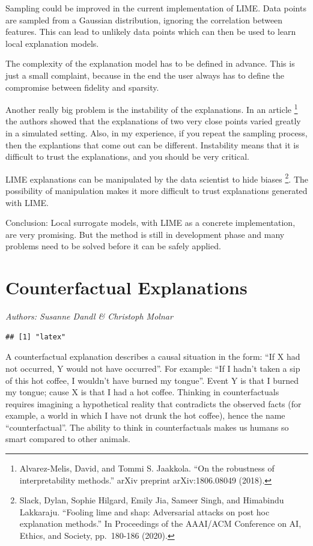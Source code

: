 \documentclass[
  11pt,
]{scrbook}
\begin{document}
Sampling could be improved in the current implementation of LIME.
Data points are sampled from a Gaussian distribution, ignoring the correlation between features.
This can lead to unlikely data points which can then be used to learn local explanation models.

The complexity of the explanation model has to be defined in advance.
This is just a small complaint, because in the end the user always has to define the compromise between fidelity and sparsity.

Another really big problem is the instability of the explanations.
In an article \footnote{Alvarez-Melis, David, and Tommi S. Jaakkola. ``On the robustness of interpretability methods.'' arXiv preprint arXiv:1806.08049 (2018).} the authors showed that the explanations of two very close points varied greatly in a simulated setting.
Also, in my experience, if you repeat the sampling process, then the explantions that come out can be different.
Instability means that it is difficult to trust the explanations, and you should be very critical.

LIME explanations can be manipulated by the data scientist to hide biases \footnote{Slack, Dylan, Sophie Hilgard, Emily Jia, Sameer Singh, and Himabindu Lakkaraju. ``Fooling lime and shap: Adversarial attacks on post hoc explanation methods.'' In Proceedings of the AAAI/ACM Conference on AI, Ethics, and Society, pp.~180-186 (2020).}.
The possibility of manipulation makes it more difficult to trust explanations generated with LIME.

Conclusion:
Local surrogate models, with LIME as a concrete implementation, are very promising.
But the method is still in development phase and many problems need to be solved before it can be safely applied.

\newpage

\hypertarget{counterfactual}{%
\section{Counterfactual Explanations}\label{counterfactual}}

\emph{Authors: Susanne Dandl \& Christoph Molnar}

\begin{verbatim}
## [1] "latex"
\end{verbatim}

A counterfactual explanation describes a causal situation in the form: ``If X had not occurred, Y would not have occurred''.
For example: ``If I hadn't taken a sip of this hot coffee, I wouldn't have burned my tongue''.
Event Y is that I burned my tongue;
cause X is that I had a hot coffee.
Thinking in counterfactuals requires imagining a hypothetical reality that contradicts the observed facts (for example, a world in which I have not drunk the hot coffee), hence the name ``counterfactual''.
The ability to think in counterfactuals makes us humans so smart compared to other animals.
\end{document}
